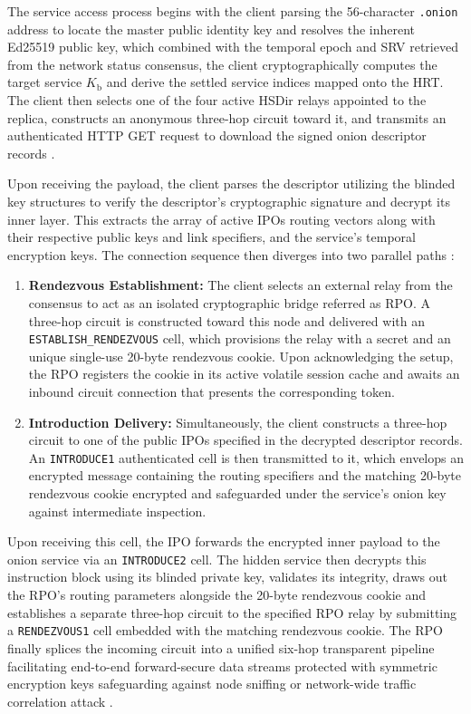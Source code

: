 \documentclass[conference]{IEEEtran}
\begin{document}
The service access process begins with the client parsing the 56-character \texttt{.onion} address to locate the master public identity key and resolves the inherent Ed25519 public key, which combined with the temporal epoch and SRV retrieved from the network status consensus, the client
cryptographically computes the target service $\textit{K}_{\text{b}}$ and derive the settled service indices mapped onto the HRT. The client then selects one of the four active HSDir relays appointed to the replica, constructs an anonymous three-hop circuit toward it, and transmits an authenticated
HTTP GET request to download the signed onion descriptor records \cite{tor_rendspec}.

Upon receiving the payload, the client parses the descriptor utilizing the blinded key structures to verify the descriptor's cryptographic signature and decrypt its inner layer. This extracts the array of active IPOs routing vectors along with their respective public keys and link specifiers, and the 
service's temporal encryption keys. The connection sequence then diverges into two parallel paths \cite{tor_rendspec}:

\begin{enumerate}
    \item \textbf{Rendezvous Establishment:} The client selects an external relay from the consensus to act as an isolated cryptographic bridge referred as RPO. A three-hop circuit is constructed toward this node and delivered with an \texttt{ESTABLISH\_RENDEZVOUS} cell, which provisions the relay with a secret and an unique single-use 20-byte rendezvous cookie. Upon acknowledging the setup, the RPO registers the cookie in its active volatile session cache and awaits an inbound circuit connection that presents the corresponding token.
    \item \textbf{Introduction Delivery:} Simultaneously, the client constructs a three-hop circuit to one of the public IPOs specified in the decrypted descriptor records. An \texttt{INTRODUCE1} authenticated cell is then transmitted to it, which envelops an encrypted message containing the routing specifiers and the matching 20-byte rendezvous cookie encrypted and safeguarded under the service's onion key against intermediate inspection.
\end{enumerate}

Upon receiving this cell, the IPO forwards the encrypted inner payload to the onion service via an \texttt{INTRODUCE2} cell. The hidden service then decrypts this instruction block using its blinded private key, validates its integrity, draws out the RPO's routing parameters alongside the 20-byte rendezvous cookie
and establishes a separate three-hop circuit to the specified RPO relay by submitting a \texttt{RENDEZVOUS1} cell embedded with the matching rendezvous cookie. The RPO finally splices the incoming circuit into a unified six-hop transparent pipeline facilitating end-to-end forward-secure data streams protected with 
symmetric encryption keys safeguarding against node sniffing or network-wide traffic correlation attack \cite{tor_rendspec}.
\end{document}
